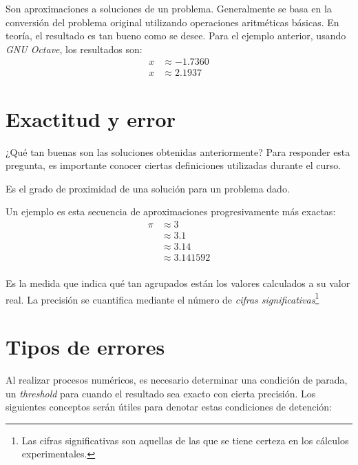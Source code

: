Son aproximaciones a soluciones de un problema. Generalmente se basa en
la conversión del problema original utilizando operaciones aritméticas
básicas. En teoría, el resultado es tan bueno como se desee. Para el
ejemplo anterior, usando \emph{GNU Octave}, los resultados son:
\begin{align*}
    x & \approx -1.7360 \\
    x & \approx 2.1937
\end{align*}

\section{Exactitud y error}

¿Qué tan buenas son las soluciones obtenidas anteriormente? Para
responder esta pregunta, es importante conocer ciertas definiciones
utilizadas durante el curso.

\begin{definition}[Exactitud]
    Es el grado de proximidad de una solución para un problema dado.


\end{definition}

\begin{eg}
    Un ejemplo es esta secuencia de aproximaciones progresivamente más exactas:
    \begin{align*} 
        \pi &\approx 3 \\ 
            &\approx 3.1 \\ 
            &\approx 3.14 \\ 
            &\approx 3.141592 \\ 
    \end{align*}

\end{eg}

\begin{definition}[Precisión]
    Es la medida que indica qué tan agrupados están los valores calculados a
    su valor real. La precisión se cuantifica mediante el número de
    \emph{cifras significativas}\footnote{Las cifras significativas son
    aquellas de las que se tiene certeza en los cálculos experimentales.}
\end{definition}


\section{Tipos de errores}

Al realizar procesos numéricos, es necesario determinar una condición de
parada, un \emph{threshold} para cuando el resultado sea exacto con
cierta precisión. Los siguientes conceptos serán útiles para denotar
estas condiciones de detención:

